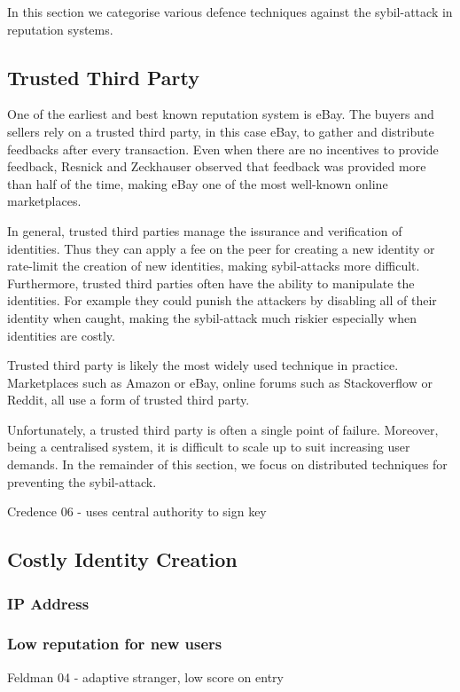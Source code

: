 In this section we categorise various defence techniques against the
sybil-attack in reputation systems.

\subsection{Trusted Third Party}\label{sec:trusted_party}
One of the earliest and best known reputation system is
eBay\cite{resnick2002trust}. The buyers and sellers rely on a trusted third
party, in this case eBay, to gather and distribute feedbacks after every
transaction. Even when there are no incentives to provide feedback, Resnick and
Zeckhauser observed that feedback was provided more than half of the
time\cite{resnick2002trust}, making eBay one of the most well-known online
marketplaces.

In general, trusted third parties manage the issurance and verification of
identities. Thus they can apply a fee on the peer for creating a new
identity\cite{resnick2001social} or rate-limit the creation of new
identities\cite{douceur2002sybil}, making sybil-attacks more difficult.
Furthermore, trusted third parties often have the ability to manipulate the
identities. For example they could punish the attackers by disabling all of
their identity when caught, making the sybil-attack much riskier especially when
identities are costly.

Trusted third party is likely the most widely used technique in practice.
Marketplaces such as Amazon or eBay, online forums such as Stackoverflow or
Reddit, all use a form of trusted third party.

Unfortunately, a trusted third party is often a single point of failure.
Moreover, being a centralised system, it is difficult to scale up to suit
increasing user demands. %
In the remainder of this section, we focus on distributed techniques for
preventing the sybil-attack.

Credence 06\cite{walsh2006experience} - uses central authority to sign key

\subsection{Costly Identity Creation}\label{sec:costly_id}
\subsubsection{IP Address}
\subsubsection{Low reputation for new users}
Feldman 04\cite{feldman2004robust} - adaptive stranger, low score on entry


